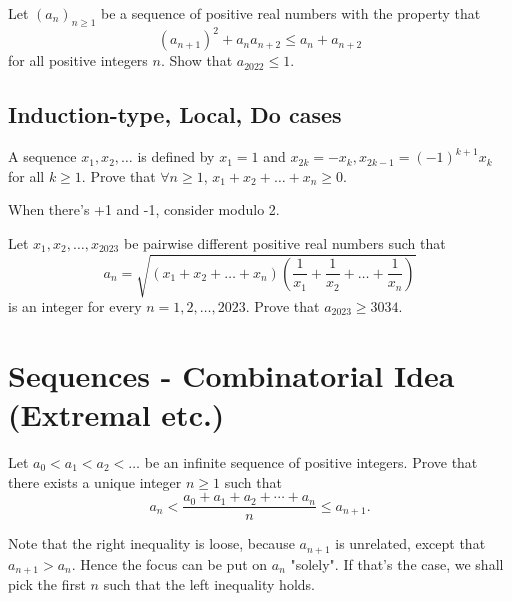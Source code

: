 \documentclass[11pt]{scrartcl}
\begin{document}
\begin{Problem}
Let $(a_n)_{n\geq 1}$ be a sequence of positive real numbers with the property that
$$(a_{n+1})^2 + a_na_{n+2} \leq a_n + a_{n+2}$$for all positive integers $n$. Show that $a_{2022}\leq 1$.
\end{Problem}





\subsection{Induction-type, Local, Do cases}
\begin{Problem}
A sequence $x_1, x_2, \ldots$ is defined by $x_1 = 1$ and $x_{2k}=-x_k, x_{2k-1} = (-1)^{k+1}x_k$ for all $k \geq 1.$ Prove that $\forall n \geq 1$, $x_1 + x_2 + \ldots + x_n \geq 0.$
\end{Problem}
\begin{lesson}
When there's +1 and -1, consider modulo 2.
\end{lesson}


\begin{Problem}
Let $x_1,x_2,\dots,x_{2023}$ be pairwise different positive real numbers such that
\[a_n=\sqrt{(x_1+x_2+\dots+x_n)\left(\frac{1}{x_1}+\frac{1}{x_2}+\dots+\frac{1}{x_n}\right)}\]is an integer for every $n=1,2,\dots,2023.$ Prove that $a_{2023} \geqslant 3034.$
\end{Problem}




\section{Sequences - Combinatorial Idea (Extremal etc.)}

\begin{Problem}
Let $a_0 < a_1 < a_2 < \dots$ be an infinite sequence of positive integers. Prove that there exists a unique integer $n\geq 1$ such that
\[a_n < \frac{a_0+a_1+a_2+\cdots+a_n}{n} \leq a_{n+1}.\]
\end{Problem}

\begin{motivation}
Note that the right inequality is loose, because $a_{n+1}$ is unrelated, except that $a_{n+1} > a_n$. Hence the focus can be put on $a_n$ "solely". If that's the case, we shall pick the first $n$ such that the left inequality holds.
\end{motivation}
\end{document}
